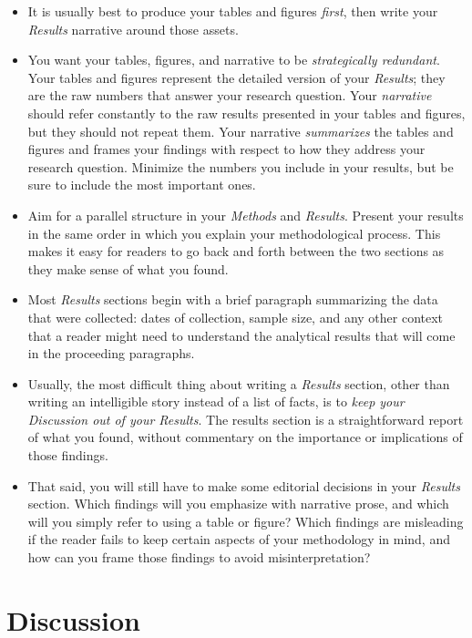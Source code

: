 \documentclass[
]{book}
\begin{document}
\begin{itemize}
\item
  It is usually best to produce your tables and figures \emph{first}, then write your \emph{Results} narrative around those assets.
\item
  You want your tables, figures, and narrative to be \emph{strategically redundant}. Your tables and figures represent the detailed version of your \emph{Results}; they are the raw numbers that answer your research question. Your \emph{narrative} should refer constantly to the raw results presented in your tables and figures, but they should not repeat them. Your narrative \emph{summarizes} the tables and figures and frames your findings with respect to how they address your research question. Minimize the numbers you include in your results, but be sure to include the most important ones.
\item
  Aim for a parallel structure in your \emph{Methods} and \emph{Results}. Present your results in the same order in which you explain your methodological process. This makes it easy for readers to go back and forth between the two sections as they make sense of what you found.
\item
  Most \emph{Results} sections begin with a brief paragraph summarizing the data that were collected: dates of collection, sample size, and any other context that a reader might need to understand the analytical results that will come in the proceeding paragraphs.
\item
  Usually, the most difficult thing about writing a \emph{Results} section, other than writing an intelligible story instead of a list of facts, is to \emph{keep your Discussion out of your Results}. The results section is a straightforward report of what you found, without commentary on the importance or implications of those findings.
\item
  That said, you will still have to make some editorial decisions in your \emph{Results} section. Which findings will you emphasize with narrative prose, and which will you simply refer to using a table or figure? Which findings are misleading if the reader fails to keep certain aspects of your methodology in mind, and how can you frame those findings to avoid misinterpretation?
\end{itemize}

\hypertarget{discussion}{%
\section*{Discussion}\label{discussion}}
\end{document}
